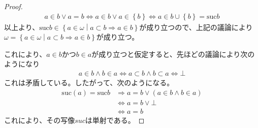 \documentclass[dvipdfmx]{jsarticle}
\begin{document}
\begin{proof}
\begin{align*}
a \in b \vee a = b \Leftrightarrow a \in b \vee a \in \left\{ b \right\} \Leftrightarrow a \in b \cup \left\{ b \right\} = {\mathrm{suc} }b
\end{align*}
以上より、${\mathrm{suc} }b \in \left\{ a \in \omega \middle| a \subset b \Rightarrow a \in b \right\}$が成り立つので、上記の議論により$\omega = \left\{ a \in \omega \middle| a \subset b \Rightarrow a \in b \right\}$が成り立つ。\par
これにより、$a \in b$かつ$b \in a$が成り立つと仮定すると、先ほどの議論により次のようになり
\begin{align*}
a \in b \land b \in a \Leftrightarrow a \subset b \land b \subset a \Leftrightarrow \bot
\end{align*}
これは矛盾している。したがって、次のようになる。
\begin{align*}
{\mathrm{suc} }(a) = {\mathrm{suc} }b &\Rightarrow a = b \vee (a \in b \land b \in a)\\
&\Leftrightarrow a = b \vee \bot\\
&\Leftrightarrow a = b
\end{align*}
これにより、その写像$suc$は単射である。
\end{proof}
\end{document}
